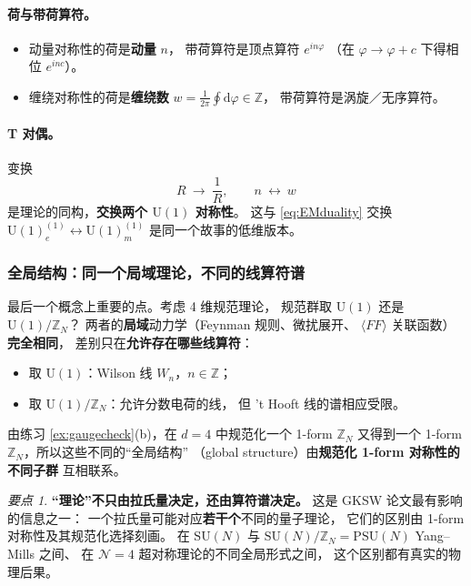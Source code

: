 \documentclass[UTF8,a4paper,11pt]{ctexart}
\theoremstyle{plain}
\theoremstyle{definition}
\theoremstyle{remark}
\newtheorem{keypoint}{要点}[section]
\newcommand{\ext}{\mathrm{d}}          %
\newcommand{\ZZ}{\mathbb{Z}}
\newcommand{\Uone}{\mathrm{U}(1)}
\newcommand{\SUgrp}{\mathrm{SU}}
\newcommand{\en}[1]{\textsf{#1}}       %
\begin{document}
\paragraph{荷与带荷算符。}
\begin{itemize}
  \item 动量对称性的荷是\textbf{动量} $n$，
        带荷算符是顶点算符 $e^{in\varphi}$
        （在 $\varphi\to\varphi+c$ 下得相位 $e^{inc}$）。
  \item 缠绕对称性的荷是\textbf{缠绕数}
        $w=\frac{1}{2\pi}\oint \ext\varphi\in\ZZ$，
        带荷算符是涡旋／无序算符。
\end{itemize}

\paragraph{T 对偶。}变换
\begin{equation}
  R\ \longrightarrow\ \frac{1}{R},
  \qquad
  n\ \longleftrightarrow\ w
  \label{eq:Tduality}
\end{equation}
是理论的同构，\textbf{交换两个 $\Uone$ 对称性}。
这与 \eqref{eq:EMduality} 交换 $\Uone_e^{(1)}\leftrightarrow\Uone_m^{(1)}$
是同一个故事的低维版本。

\subsubsection{全局结构：同一个局域理论，不同的线算符谱}

最后一个概念上重要的点。考虑 4 维规范理论，
规范群取 $\Uone$ 还是 $\Uone/\ZZ_N$？
两者的\textbf{局域}动力学（Feynman 规则、微扰展开、
$\langle F F\rangle$ 关联函数）\textbf{完全相同}，
差别只在\textbf{允许存在哪些线算符}：

\begin{itemize}
  \item 取 $\Uone$：Wilson 线 $W_n$，$n\in\ZZ$；
  \item 取 $\Uone/\ZZ_N$：允许分数电荷的线，
        但 't Hooft 线的谱相应受限。
\end{itemize}

由练习 \ref{ex:gaugecheck}(b)，在 $d=4$ 中规范化一个 1-form $\ZZ_N$
又得到一个 1-form $\ZZ_N$，所以这些不同的“全局结构”
（\en{global structure}）由\textbf{规范化 1-form 对称性的不同子群}
互相联系。

\begin{keypoint}
\label{kp:globalstructure}
\textbf{“理论”不只由拉氏量决定，还由算符谱决定。}
这是 GKSW 论文最有影响的信息之一：
一个拉氏量可能对应\textbf{若干个}不同的量子理论，
它们的区别由 1-form 对称性及其规范化选择刻画。
在 $\SUgrp(N)$ 与 $\SUgrp(N)/\ZZ_N=\mathrm{PSU}(N)$ Yang--Mills 之间、
在 $\mathcal N=4$ 超对称理论的不同全局形式之间，
这个区别都有真实的物理后果。
\end{keypoint}
\end{document}
